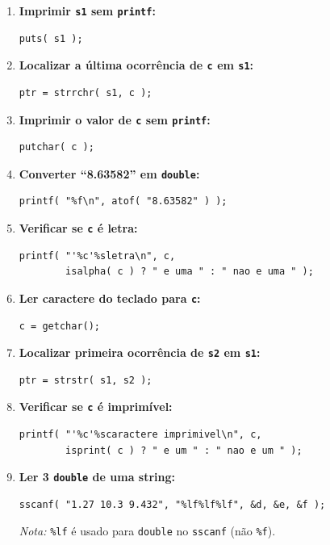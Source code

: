 \documentclass[12pt,a4paper]{article}
\begin{document}
\begin{respostabox}
\begin{enumerate}[label=\textbf{\alph*)}]
\item \textbf{Imprimir \texttt{s1} sem \texttt{printf}:}
\begin{lstlisting}
puts( s1 );
\end{lstlisting}

\item \textbf{Localizar a última ocorrência de \texttt{c} em \texttt{s1}:}
\begin{lstlisting}
ptr = strrchr( s1, c );
\end{lstlisting}

\item \textbf{Imprimir o valor de \texttt{c} sem \texttt{printf}:}
\begin{lstlisting}
putchar( c );
\end{lstlisting}

\item \textbf{Converter ``8.63582'' em \texttt{double}:}
\begin{lstlisting}
printf( "%f\n", atof( "8.63582" ) );
\end{lstlisting}

\item \textbf{Verificar se \texttt{c} é letra:}
\begin{lstlisting}
printf( "'%c'%sletra\n", c,
        isalpha( c ) ? " e uma " : " nao e uma " );
\end{lstlisting}

\item \textbf{Ler caractere do teclado para \texttt{c}:}
\begin{lstlisting}
c = getchar();
\end{lstlisting}

\item \textbf{Localizar primeira ocorrência de \texttt{s2} em \texttt{s1}:}
\begin{lstlisting}
ptr = strstr( s1, s2 );
\end{lstlisting}

\item \textbf{Verificar se \texttt{c} é imprimível:}
\begin{lstlisting}
printf( "'%c'%scaractere imprimivel\n", c,
        isprint( c ) ? " e um " : " nao e um " );
\end{lstlisting}

\item \textbf{Ler 3 \texttt{double} de uma string:}
\begin{lstlisting}
sscanf( "1.27 10.3 9.432", "%lf%lf%lf", &d, &e, &f );
\end{lstlisting}
\textit{Nota:} \texttt{\%lf} é usado para \texttt{double} no \texttt{sscanf} (não \texttt{\%f}).


\end{enumerate}
\end{respostabox}
\end{document}
